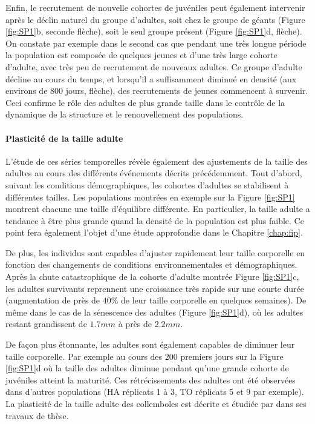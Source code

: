 Enfin, le recrutement de nouvelle cohortes de juvéniles peut également
intervenir après le déclin naturel du groupe d'adultes, soit chez le groupe de
géants (Figure \ref{fig:SP1}b, seconde flèche), soit le seul groupe présent
(Figure \ref{fig:SP1}d, flèche). On constate par exemple dans le second cas que
pendant une très longue période la population est composée de quelques jeunes et
d'une très large cohorte d'adulte, avec très peu de recrutement de nouveaux
adultes. Ce groupe d'adulte décline au cours du temps, et lorsqu'il a
suffisamment diminué en densité (aux environs de $800$ jours, flèche), des
recrutements de jeunes commencent à survenir. Ceci confirme le rôle des
adultes de plus grande taille dans le contrôle de la dynamique de la structure
et le renouvellement des populations. 

\paragraph{Plasticité de la taille adulte}

L'étude de ces séries temporelles révèle également des ajustements de la taille
des adultes au cours des différents événements décrits précédemment. Tout
d'abord, suivant les conditions démographiques, les cohortes d'adultes se
stabilisent à différentes tailles. Les populations montrées en exemple sur la
Figure \ref{fig:SP1} montrent chacune une taille d'équilibre différente. En
particulier, la taille adulte a tendance à être plus grande quand la densité
de la population est plus faible. Ce point fera également l'objet d'une étude
approfondie dans le Chapitre \ref{chap:fip}.

De plus, les individus sont capables d'ajuster rapidement leur taille corporelle
en fonction des changements de conditions environnementales et démographiques.
Après la chute catastrophique de la cohorte d'adulte montrée Figure
\ref{fig:SP1}c, les adultes survivants reprennent une croissance très rapide sur
une courte durée (augmentation de près de $40\%$ de leur taille corporelle en
quelques semaines).
De même dans le cas de la sénescence des adultes (Figure \ref{fig:SP1}d), où les
adultes restant grandissent de $1.7mm$ à près de $2.2mm$.

De façon plus étonnante, les adultes sont également capables de diminuer leur
taille corporelle. Par exemple au cours des $200$ premiers jours sur la Figure
\ref{fig:SP1}d où la taille des adultes diminue pendant qu'une grande cohorte de
juvéniles atteint la maturité. Ces rétrécissements des adultes ont été observées
dans d'autres populations (HA réplicats 1 à 3, TO réplicats 5 et 9 par exemple).
La plasticité de la taille adulte des collemboles est décrite et étudiée par
\textcites{mallard2013b} dans ses travaux de thèse.

